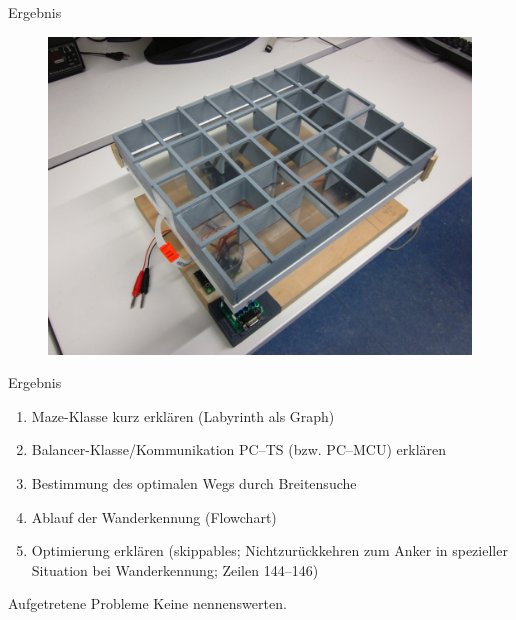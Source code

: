 \documentclass{beamer}
\begin{document}
\begin{frame}[fragile,t]{Ergebnis}
\begin{figure}
  \centering
  \includegraphics[scale=.0675]{roboter}
\end{figure}
\end{frame}

\begin{frame}[fragile,t]{Ergebnis}
\begin{enumerate}
\item Maze-Klasse kurz erklären (Labyrinth als Graph)
\item Balancer-Klasse/Kommunikation PC--TS (bzw. PC--MCU) erklären
\item Bestimmung des optimalen Wegs durch Breitensuche
\item Ablauf der Wanderkennung (Flowchart)
\item Optimierung erklären (skippables; Nichtzurückkehren zum Anker in spezieller Situation bei Wanderkennung; Zeilen 144--146)
\end{enumerate}
\end{frame}

\begin{frame}[fragile,t]{Aufgetretene Probleme}
Keine nennenswerten. 
\end{frame}
\end{document}
